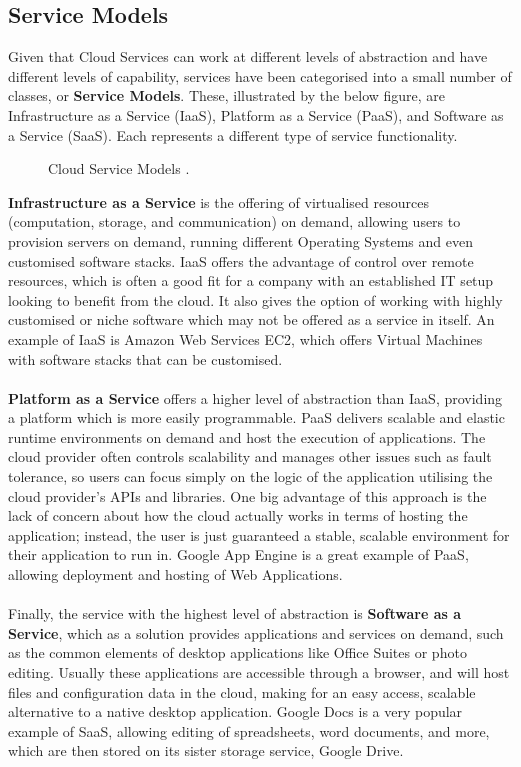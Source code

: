 \subsection{Service Models}
Given that Cloud Services can work at different levels of abstraction and have different levels of capability, services have been categorised into a small number of classes, or \textbf{Service Models}\cite{nistcloud}. These, illustrated by the below figure, are Infrastructure as a Service (IaaS), Platform as a Service (PaaS), and Software as a Service (SaaS). Each represents a different type of service functionality. 

\begin{figure}[ht]
\centering
{}
\caption{Cloud Service Models \cite{masteringcloudcomputing}.}
\end{figure}

\textbf{Infrastructure as a Service} is the offering of virtualised resources (computation, storage, and communication) on demand\cite{vimprivatehybrid}, allowing users to provision servers on demand, running different Operating Systems and even customised software stacks. IaaS offers the advantage of control over remote resources, which is often a good fit for a company with an established IT setup looking to benefit from the cloud. It also gives the option of working with highly customised or niche software which may not be offered as a service in itself. An example of IaaS is Amazon Web Services EC2, which offers Virtual Machines with software stacks that can be customised. \cite{principlesparadigms}\\ \\
\textbf{Platform as a Service} offers a higher level of abstraction than IaaS, providing a platform which is more easily programmable. PaaS delivers scalable and elastic runtime environments on demand and host the execution of applications\cite{masteringcloudcomputing}. The cloud provider often controls scalability and manages other issues such as fault tolerance, so users can focus simply on the logic of the application utilising the cloud provider's APIs and libraries\cite{masteringcloudcomputing}. One big advantage of this approach is the lack of concern about how the cloud actually works in terms of hosting the application; instead, the user is just guaranteed a stable, scalable environment for their application to run in. Google App Engine is a great example of PaaS, allowing deployment and hosting of Web Applications\cite{googleappengine}.\\ \\
Finally, the service with the highest level of abstraction is \textbf{Software as a Service}, which as a solution provides applications and services on demand\cite{masteringcloudcomputing}, such as the common elements of desktop applications like Office Suites or photo editing. Usually these applications are accessible through a browser, and will host files and configuration data in the cloud, making for an easy access, scalable alternative to a native desktop application. Google Docs is a very popular example of SaaS, allowing editing of spreadsheets, word documents, and more, which are then stored on its sister storage service, Google Drive\cite{googledrive}.   
 
